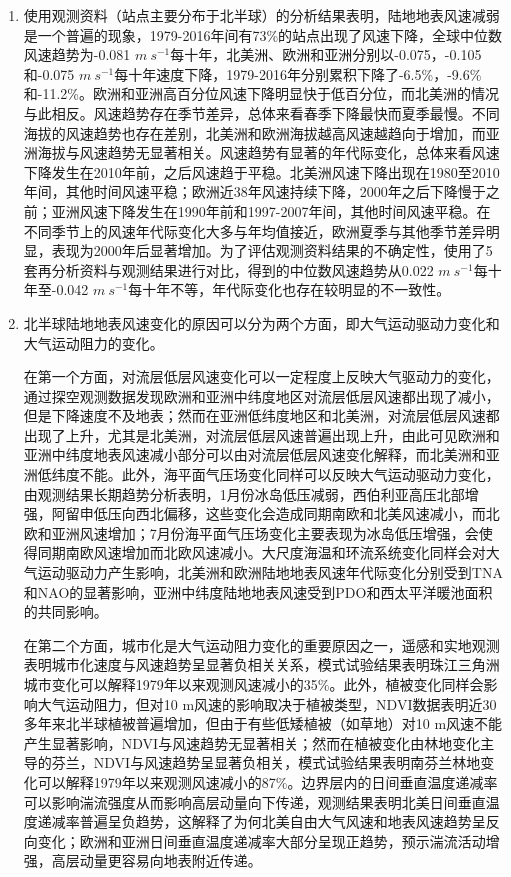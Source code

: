 \begin{enumerate}

\item 使用观测资料（站点主要分布于北半球）的分析结果表明，陆地地表风速减弱是一个普遍的现象，1979-2016年间有73\%的站点出现了风速下降，全球中位数风速趋势为-0.081 $m ~ s^{-1}$每十年，北美洲、欧洲和亚洲分别以-0.075，-0.105和-0.075 $m ~ s^{-1}$每十年速度下降，1979-2016年分别累积下降了-6.5\%，-9.6\%和-11.2\%。欧洲和亚洲高百分位风速下降明显快于低百分位，而北美洲的情况与此相反。风速趋势存在季节差异，总体来看春季下降最快而夏季最慢。不同海拔的风速趋势也存在差别，北美洲和欧洲海拔越高风速越趋向于增加，而亚洲海拔与风速趋势无显著相关。风速趋势有显著的年代际变化，总体来看风速下降发生在2010年前，之后风速趋于平稳。北美洲风速下降出现在1980至2010年间，其他时间风速平稳；欧洲近38年风速持续下降，2000年之后下降慢于之前；亚洲风速下降发生在1990年前和1997-2007年间，其他时间风速平稳。在不同季节上的风速年代际变化大多与年均值接近，欧洲夏季与其他季节差异明显，表现为2000年后显著增加。为了评估观测资料结果的不确定性，使用了5套再分析资料与观测结果进行对比，得到的中位数风速趋势从0.022 $m ~ s^{-1}$每十年至-0.042 $m ~ s^{-1}$每十年不等，年代际变化也存在较明显的不一致性。

\item 北半球陆地地表风速变化的原因可以分为两个方面，即大气运动驱动力变化和大气运动阻力的变化。

在第一个方面，对流层低层风速变化可以一定程度上反映大气驱动力的变化，通过探空观测数据发现欧洲和亚洲中纬度地区对流层低层风速都出现了减小，但是下降速度不及地表；然而在亚洲低纬度地区和北美洲，对流层低层风速都出现了上升，尤其是北美洲，对流层低层风速普遍出现上升，由此可见欧洲和亚洲中纬度地表风速减小部分可以由对流层低层风速变化解释，而北美洲和亚洲低纬度不能。此外，海平面气压场变化同样可以反映大气运动驱动力变化，由观测结果长期趋势分析表明，1月份冰岛低压减弱，西伯利亚高压北部增强，阿留申低压向西北偏移，这些变化会造成同期南欧和北美风速减小，而北欧和亚洲风速增加；7月份海平面气压场变化主要表现为冰岛低压增强，会使得同期南欧风速增加而北欧风速减小。大尺度海温和环流系统变化同样会对大气运动驱动力产生影响，北美洲和欧洲陆地地表风速年代际变化分别受到TNA和NAO的显著影响，亚洲中纬度陆地地表风速受到PDO和西太平洋暖池面积的共同影响。

在第二个方面，城市化是大气运动阻力变化的重要原因之一，遥感和实地观测表明城市化速度与风速趋势呈显著负相关关系，模式试验结果表明珠江三角洲城市变化可以解释1979年以来观测风速减小的35\%。此外，植被变化同样会影响大气运动阻力，但对10 m风速的影响取决于植被类型，NDVI数据表明近30多年来北半球植被普遍增加，但由于有些低矮植被（如草地）对10 m风速不能产生显著影响，NDVI与风速趋势无显著相关；然而在植被变化由林地变化主导的芬兰，NDVI与风速趋势呈显著负相关，模式试验结果表明南芬兰林地变化可以解释1979年以来观测风速减小的87\%。边界层内的日间垂直温度递减率可以影响湍流强度从而影响高层动量向下传递，观测结果表明北美日间垂直温度递减率普遍呈负趋势，这解释了为何北美自由大气风速和地表风速趋势呈反向变化；欧洲和亚洲日间垂直温度递减率大部分呈现正趋势，预示湍流活动增强，高层动量更容易向地表附近传递。


\end{enumerate}
